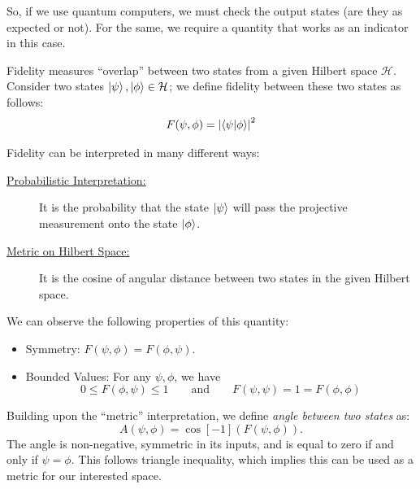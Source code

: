\documentclass[11pt, oneside, listof=totoc]{scrbook}
\renewcommand{\H}{\mathcal{H}}
\begin{document}
So, if we use quantum computers, we must check the output states (are they as expected or not). For the same, we require a quantity that works as an indicator in this case.
\begin{definition}[Fidelity]
    Fidelity measures ``overlap'' between two states from a given Hilbert space \(\H\). Consider two states \(\ket{\psi}, \ket{\phi} \in \H\); we define fidelity between these two states as follows:
    \begin{equation}
        F(\psi, \phi) = \abs{\ip{\psi}{\phi}}^2
    \end{equation}
\end{definition}
Fidelity can be interpreted in many different ways:
\begin{description}
    \item[\normalfont \uline{Probabilistic Interpretation:}] It is the probability that the state \(\ket{\psi}\) will pass the projective measurement onto the state \(\ket{\phi}\).
    \item[\normalfont \uline{Metric on Hilbert Space:}] It is the cosine of angular distance between two states in the given Hilbert space.\label{info:metric}
\end{description}

\noindent We can observe the following properties of this quantity:
\begin{itemize}
    \item {\sffamily Symmetry:} \(F(\psi, \phi) = F(\phi, \psi)\).
    \item {\sffamily Bounded Values:} For any \(\psi, \phi\), we have
          \begin{equation*}
              0 \le F(\phi, \psi) \le 1 \qquad \mbox{and} \qquad F(\psi, \psi) = 1 = F(\phi, \phi)
          \end{equation*}
\end{itemize}

\begin{remark}
    Building upon the ``metric'' interpretation, we define \emph{angle between two states} as:
    \begin{equation*}
        A(\psi, \phi) = \cos[-1](F(\psi, \phi)).
    \end{equation*}
    The angle is non-negative, symmetric in its inputs, and is equal to zero if and only if $\psi = \phi$. This follows triangle inequality, which implies this can be used as a metric for our interested space.
\end{remark}
\end{document}
